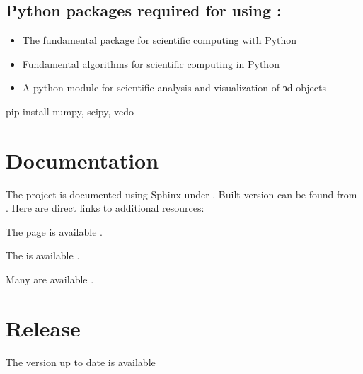 \documentclass[letterpaper,10pt,english]{sphinxmanual}
\begin{document}
\section{Python packages required for using :}
\label{\detokenize{index:python-packages-required-for-using-myfempy}}\begin{itemize}
\item {} 
\sphinxAtStartPar
{} \sphinxhyphen{} The fundamental package for
scientific computing with Python

\item {} 
\sphinxAtStartPar
{} \sphinxhyphen{} Fundamental algorithms for
scientific computing in Python

\item {} 
\sphinxAtStartPar
{} \sphinxhyphen{} A python module for scientific
analysis and visualization of эd objects

\end{itemize}

\begin{sphinxVerbatim}[commandchars=\\\{\}]
pip install numpy, scipy, vedo
\end{sphinxVerbatim}


\chapter{Documentation}
\label{\detokenize{index:documentation}}
\sphinxAtStartPar
The project is documented using Sphinx under . Built version
can be found from .
Here are direct links to additional resources:

\sphinxAtStartPar
The  page is available
.

\sphinxAtStartPar
The  is available
.

\sphinxAtStartPar
Many  are available
.


\chapter{Release}
\label{\detokenize{index:release}}
\sphinxAtStartPar
The version up to date is available
\end{document}
